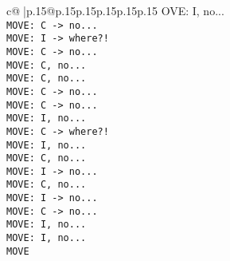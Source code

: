 \documentclass{article}
\begin{document}
{\begin{supertabular}{c@{$\;$}|p{.15\linewidth}@{}p{.15\linewidth}p{.15\linewidth}p{.15\linewidth}p{.15\linewidth}p{.15\linewidth}}
{{{OVE: I, no...\\ \tt  MOVE: C -> no...\\ \tt  MOVE: I -> where?!\\ \tt  MOVE: C -> no...\\ \tt  MOVE: C, no...\\ \tt  MOVE: C, no...\\ \tt  MOVE: C -> no...\\ \tt  MOVE: C -> no...\\ \tt  MOVE: I, no...\\ \tt  MOVE: C -> where?!\\ \tt  MOVE: I, no...\\ \tt  MOVE: C, no...\\ \tt  MOVE: I -> no...\\ \tt  MOVE: C, no...\\ \tt  MOVE: I -> no...\\ \tt  MOVE: C -> no...\\ \tt  MOVE: I, no...\\ \tt  MOVE: I, no...\\ \tt  MOVE}}}
\end{supertabular}}
\end{document}
